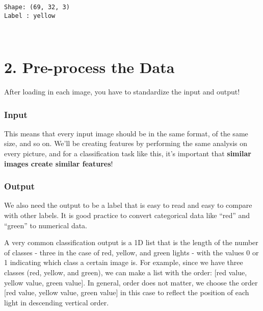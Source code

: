 \documentclass[11pt]{article}
\begin{document}
    \begin{Verbatim}[commandchars=\\\{\}]
Shape: (69, 32, 3)
Label : yellow

    \end{Verbatim}

    \begin{center}
    \end{center}
    { \hspace*{\fill} \\}
    
    \hypertarget{pre-process-the-data}{%
\section{2. Pre-process the Data}\label{pre-process-the-data}}

After loading in each image, you have to standardize the input and
output!

\hypertarget{input}{%
\subsubsection{Input}\label{input}}

This means that every input image should be in the same format, of the
same size, and so on. We'll be creating features by performing the same
analysis on every picture, and for a classification task like this, it's
important that \textbf{similar images create similar features}!

\hypertarget{output}{%
\subsubsection{Output}\label{output}}

We also need the output to be a label that is easy to read and easy to
compare with other labels. It is good practice to convert categorical
data like ``red'' and ``green'' to numerical data.

A very common classification output is a 1D list that is the length of
the number of classes - three in the case of red, yellow, and green
lights - with the values 0 or 1 indicating which class a certain image
is. For example, since we have three classes (red, yellow, and green),
we can make a list with the order: {[}red value, yellow value, green
value{]}. In general, order does not matter, we choose the order {[}red
value, yellow value, green value{]} in this case to reflect the position
of each light in descending vertical order.
\end{document}
